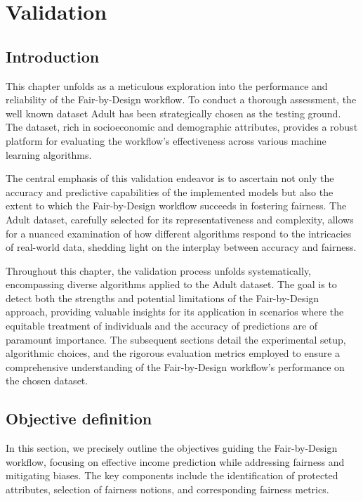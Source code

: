 \chapter{Validation}
\label{chap:validation}

\section{Introduction}

This chapter unfolds as a meticulous exploration into the performance and reliability of the Fair-by-Design workflow. To conduct a thorough assessment, the well known dataset Adult has been strategically chosen as the testing ground. The dataset, rich in socioeconomic and demographic attributes, provides a robust platform for evaluating the workflow's effectiveness across various machine learning algorithms.

The central emphasis of this validation endeavor is to ascertain not only the accuracy and predictive capabilities of the implemented models but also the extent to which the Fair-by-Design workflow succeeds in fostering fairness. The Adult dataset, carefully selected for its representativeness and complexity, allows for a nuanced examination of how different algorithms respond to the intricacies of real-world data, shedding light on the interplay between accuracy and fairness.

Throughout this chapter, the validation process unfolds systematically, encompassing diverse algorithms applied to the Adult dataset. The goal is to detect both the strengths and potential limitations of the Fair-by-Design approach, providing valuable insights for its application in scenarios where the equitable treatment of individuals and the accuracy of predictions are of paramount importance. The subsequent sections detail the experimental setup, algorithmic choices, and the rigorous evaluation metrics employed to ensure a comprehensive understanding of the Fair-by-Design workflow's performance on the chosen dataset.

\section{Objective definition}
\label{section:val_obj}

In this section, we precisely outline the objectives guiding the Fair-by-Design workflow, focusing on effective income prediction while addressing fairness and mitigating biases. The key components include the identification of protected attributes, selection of fairness notions, and corresponding fairness metrics.

